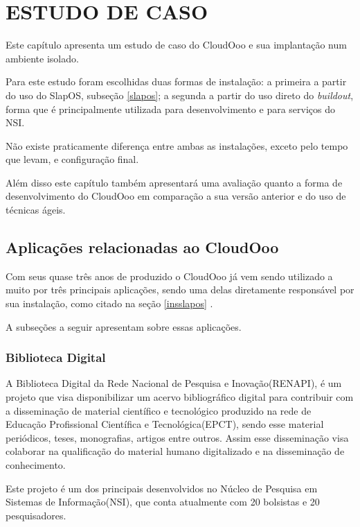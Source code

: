 \chapter{ESTUDO DE CASO}
\thispagestyle{empty}

Este capítulo apresenta um estudo de caso do CloudOoo e sua implantação num ambiente isolado.

Para este estudo foram escolhidas duas formas de instalação: a primeira a partir do uso do SlapOS, subseção \ref{slapos}; a segunda a partir do uso direto do \textit{buildout}, forma que é principalmente utilizada para desenvolvimento e para serviços do NSI.

Não existe praticamente diferença entre ambas as instalações, exceto pelo tempo que levam, e configuração final.

Além disso este capítulo também apresentará uma avaliação quanto a forma de desenvolvimento do CloudOoo em comparação a sua versão anterior e do uso de técnicas ágeis.


\section{Aplicações relacionadas ao CloudOoo}

Com seus quase três anos de produzido o CloudOoo já vem sendo utilizado a muito por três principais aplicações, sendo uma delas diretamente responsável por sua instalação, como citado na seção \ref{insslapos} .

A subseções a seguir apresentam sobre essas aplicações.


\subsection{Biblioteca Digital}

A Biblioteca Digital da Rede Nacional de Pesquisa e Inovação(RENAPI), é um projeto que visa disponibilizar um acervo bibliográfico digital para contribuir com a disseminação de material científico e tecnológico produzido na rede de Educação Profissional Científica e Tecnológica(EPCT), sendo esse material periódicos, teses, monografias, artigos entre outros. Assim esse disseminação visa colaborar na qualificação do material humano digitalizado e na disseminação de conhecimento.

Este projeto é um dos principais desenvolvidos no Núcleo de Pesquisa em Sistemas de Informação(NSI), que conta atualmente com 20 bolsistas e 20 pesquisadores.


